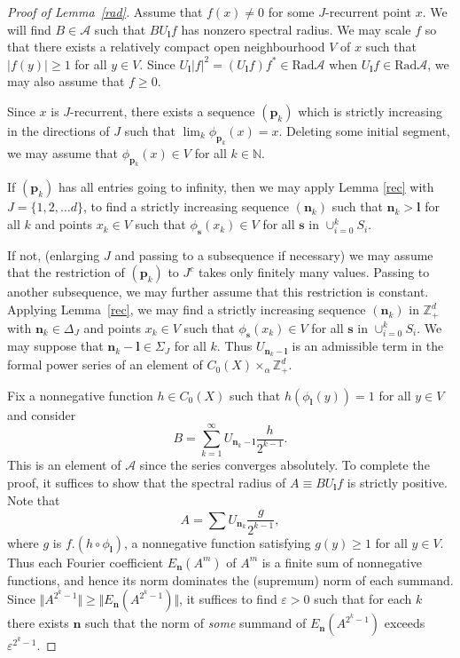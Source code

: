 \documentclass[12pt]{amsart}
\theoremstyle{definition}
\newcommand{\mcA}{\mathcal{A}}
\newcommand{\bbZ}{\mathbb{Z}}
\newcommand{\rad}{\mathrm{Rad}}
\newcommand{\bo}[1]{\mathbf{#1}}
\newcommand{\bon}{\mathbf{n}}
\begin{document}
\begin{proof}[Proof of Lemma~\ref{rad}]
Assume that $f(x) \ne0$ for some $J$-recurrent point $x$.
We will find $B \in\mcA$ such that $B U_{\bo{l}} f$ has
nonzero spectral radius.
We may scale $f$ so that there exists a relatively compact open
neighbourhood $V$ of $x$ such that $|f(y)|\geq1$ for all $y\in V$.
Since $U_\bo{l} |f|^2 =(U_{\bo{l}}f)f^* \in\rad\mcA$ when
$U_\bo{l} f\in\rad\mcA$, we may also assume that $f\geq0$.

Since $x$ is $J$-recurrent, there exists a sequence
$(\bo{p}_{k})$ which is strictly increasing in the directions
of $J$ such that $\lim_{k}\phi_{\bo{p}_{k}}(x)=x$.
Deleting some initial segment, we may assume that
$\phi_{\bo{p}_{k}}(x)\in V$ for all $k\in\mathbb{N}$.

If $(\bo{p}_k)$ has all entries going to infinity, then we may
apply Lemma \ref{rec} with $J=\{1,2,\ldots d\}$, to find a
strictly increasing sequence $(\bon_{k})$ such that
$\bon_k>\bo{l}$ for all $k$ and points $x_k \in V$ such that
$\phi_{\bo{s}}(x_k)\in V$ for all $\bo{s}$ in
$\cup_{i=0}^{k}S_{i}.$

If not, (enlarging $J$ and passing to a subsequence if necessary)
we may assume that the restriction of $(\bo{p}_{k})$ to $J^{c}$
takes only finitely many values.
Passing to another subsequence, we may further assume that
this restriction is constant.
Applying Lemma~\ref{rec}, we may find a strictly increasing sequence
$(\bon_k)$ in $\bbZ_+^d$ with $\bon_k \in \Delta_J$ and points
$x_k \in V$ such that
$\phi_{\bo{s}}(x_k)\in V$ 
for all $\bo{s}$ in $\cup_{i=0}^{k}S_{i}.$
We may suppose that $\bon_{k}-\bo{l}\in\Sigma_{J}$ for all $k$.
Thus $U_{\bo{n}_k-\bo{l}}$ is an admissible term in
the formal power series of an element of
$C_0(X)\times_\alpha \bbZ_+^d$.

Fix a nonnegative function $h\in C_{0}(X)$ such that
$h(\phi_{\bo{l}}(y))=1$ for all $y\in V$ and consider
\[
B=\sum_{k=1}^{\infty} U_{\bon_{k}-\bo{l}} \frac{h}{2^{k-1}}.
\]
This is an element of $\mcA$ since the series converges
absolutely. To complete the proof, it suffices to show that the
spectral radius of $A\equiv BU_{\bo{l}}f$ is strictly positive.
Note that
\[ A =\sum U_{\bon_{k}} \frac{g}{2^{k-1}}, \]
where $g$ is $f.(h\circ\phi_{\bo{l}})$, a nonnegative function
satisfying $g(y)\geq1$ for all $y\in V$.
Thus each Fourier coefficient $E_{\bon}(A^{m})$ of $A^{m}$ is
a finite sum of nonnegative functions, and hence its
norm dominates the (supremum) norm of each summand.
Since $\Vert A^{2^{k}-1}\Vert\geq\Vert E_{\bon}(A^{2^{k}-1})\Vert$,
it suffices to find $\varepsilon>0$ such that for each $k$ there
exists $\bon$ such that the norm of \emph{some} summand of
$E_{\bon}(A^{2^{k}-1})$ exceeds $\varepsilon^{2^{k}-1}$.


\end{proof}
\end{document}
